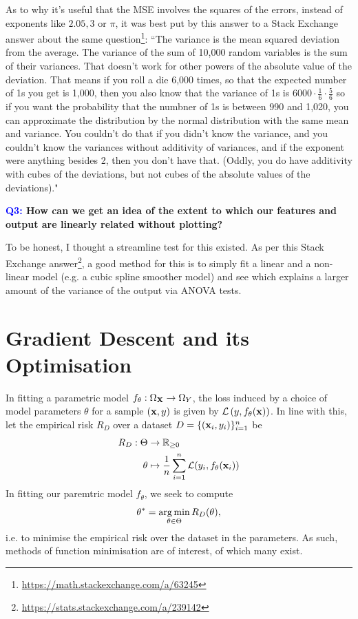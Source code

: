 \documentclass[11pt]{article}
\begin{document}
As to why it's useful that the MSE involves the squares of the errors, instead of exponents like $2.05, 3$ or $\pi$, it was best put by this answer to a Stack Exchange answer about the same question\footnote{\url{https://math.stackexchange.com/a/63245}}: ``The variance is the mean squared deviation from the average. The variance of the sum of 10,000 random variables is the sum of their variances. That doesn't work for other powers of the absolute value of the deviation. That means if you roll a die 6,000 times, so that the expected number of 1s you get is 1,000, then you also know that the variance of 1s is $6000\cdot\frac{1}{6}\cdot\frac{5}{6}$ so if you want the probability that the numbner of 1s is between 990 and 1,020, you can approximate the distribution by the normal distribution with the same mean and variance. You couldn't do that if you didn't know the variance, and you couldn't know the variances without additivity of variances, and if the exponent were anything besides 2, then you don't have that. (Oddly, you do have additivity with cubes of the deviations, but not cubes of the absolute values of the deviations)."

\begin{center}
    \textbf{\textcolor{blue}{Q3:} How can we get an idea of the extent to which our features and output are linearly related without plotting?}
\end{center}
To be honest, I thought a streamline test for this existed. As per this Stack Exchange answer\footnote{\url{https://stats.stackexchange.com/a/239142}}, a good method for this is to simply fit a linear and a non-linear model (e.g. a cubic spline smoother model) and see which explains a larger amount of the variance of the output via ANOVA tests.

\section{Gradient Descent and its Optimisation}
In fitting a parametric model $f_{\theta}:\Omega_{\mathbf{X}}\to\Omega_{Y}$, the loss induced by a choice of model parameters $\theta$ for a sample $(\mathbf{x},y)$ is given by $\mathcal{L}\left(y,f_{\theta}(\mathbf{x})\right)$. In line with this, let the empirical risk $R_D$ over a dataset $D=\{(\mathbf{x}_i,y_i)\}_{i=1}^n$ be
\begin{align*}
    R_D:\Theta&\to\mathbb{R}_{\geq0}\\
    \theta&\mapsto\frac{1}{n}\sum_{i=1}^n\mathcal{L}(y_i,f_{\theta}(\mathbf{x}_i))
\end{align*}
In fitting our paremtric model $f_{\theta}$, we seek to compute
$$
\theta^{*}
=
\operatorname*{arg\,min}_{\theta\in\Theta}R_D(\theta),
$$
i.e. to minimise the empirical risk over the dataset in the parameters. As such, methods of function minimisation are of interest, of which many exist.
\end{document}
